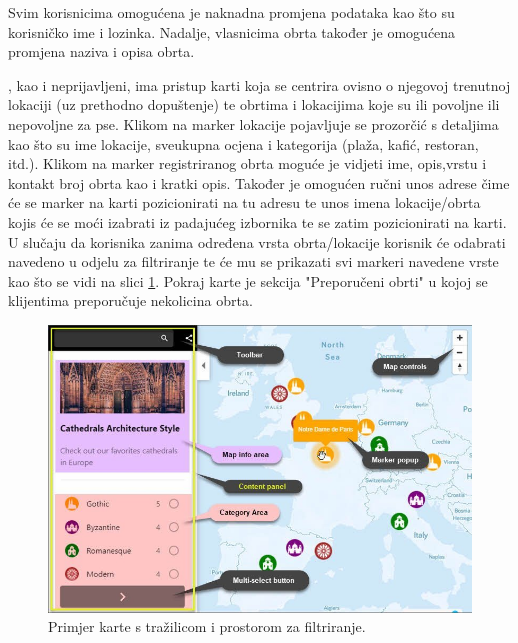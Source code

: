 		Svim  korisnicima omogućena je naknadna promjena podataka kao što su korisničko ime i lozinka. Nadalje, vlasnicima obrta također je omogućena promjena naziva i opisa obrta.\newline
		
		, kao i neprijavljeni, ima pristup karti koja se centrira ovisno o njegovoj trenutnoj lokaciji (uz prethodno dopuštenje) te obrtima i lokacijima koje su ili povoljne ili nepovoljne za pse. Klikom na marker lokacije pojavljuje se prozorčić s detaljima kao što su ime lokacije, sveukupna ocjena i kategorija (plaža, kafić, restoran, itd.). Klikom na marker registriranog obrta moguće je vidjeti ime, opis,vrstu i kontakt broj obrta kao i kratki opis. Također je omogućen ručni unos adrese čime će se marker na karti pozicionirati na tu adresu te unos imena lokacije/obrta kojis će se moći izabrati iz padajućeg izbornika te se zatim pozicionirati na karti. U slučaju da korisnika zanima određena vrsta obrta/lokacije korisnik će odabrati navedeno u odjelu za filtriranje te će mu se prikazati svi markeri navedene vrste kao što se vidi na slici \ref{fig:primjerMape}. Pokraj karte je sekcija "Preporučeni obrti" u kojoj se klijentima preporučuje nekolicina obrta.\newline
		
		\begin{figure}[H]
			\includegraphics[width=\textwidth]{slike/map_example.png} %
			\caption{Primjer karte s tražilicom i prostorom za filtriranje.}
			\label{fig:primjerMape} %
		\end{figure}
		

